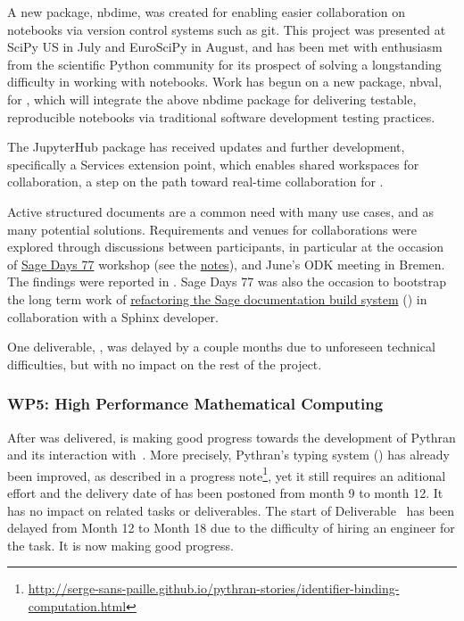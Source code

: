 \documentclass{deliverablereport}
\begin{document}
A new \Jupyter package, nbdime, was created for 
enabling easier collaboration on notebooks via version control systems such as git.
This project was presented at SciPy US in July and EuroSciPy in August,
and has been met with enthusiasm from the scientific Python community
for its prospect of solving a longstanding difficulty in working with notebooks.
Work has begun on a new package, nbval, for ,
which will integrate the above nbdime package for delivering testable,
reproducible notebooks via traditional software development testing practices.

The JupyterHub package has received updates and further development,
specifically a Services extension point,
which enables shared workspaces for collaboration,
a step on the path toward real-time collaboration for .

Active structured documents are a common need with many use cases, and
as many potential solutions. Requirements and venues for
collaborations were explored through discussions between participants,
in particular at the occasion of
\href{https://wiki.sagemath.org/days77/}{Sage Days 77} workshop (see
the
\href{https://wiki.sagemath.org/days77/live-structured-documents}{notes}),
and June's ODK meeting in Bremen. The findings were reported in
. Sage Days 77 was also the occasion to bootstrap the long term work of
\href{https://wiki.sagemath.org/days77/documentation}{refactoring the
  Sage documentation build system} () in
collaboration with a Sphinx developer.

One deliverable, , was delayed by a
couple months due to unforeseen technical difficulties, but with no
impact on the rest of the project.

\subsubsection{WP5: High Performance Mathematical Computing}

After  was delivered,  is making good progress towards the development of Pythran and its
interaction with~\Sage.
More precisely, Pythran's typing system () has already been improved, as described
in a progress note\footnote{\url{http://serge-sans-paille.github.io/pythran-stories/identifier-binding-computation.html}},
yet it still requires an aditional effort and the delivery date of
 has been postoned from month 9 to month 12. It
has no impact on related tasks or
deliverables. The start of Deliverable~ has been
delayed from Month 12 to Month 18 due to the difficulty of hiring an engineer for the task. It is now
making good progress.
\end{document}

